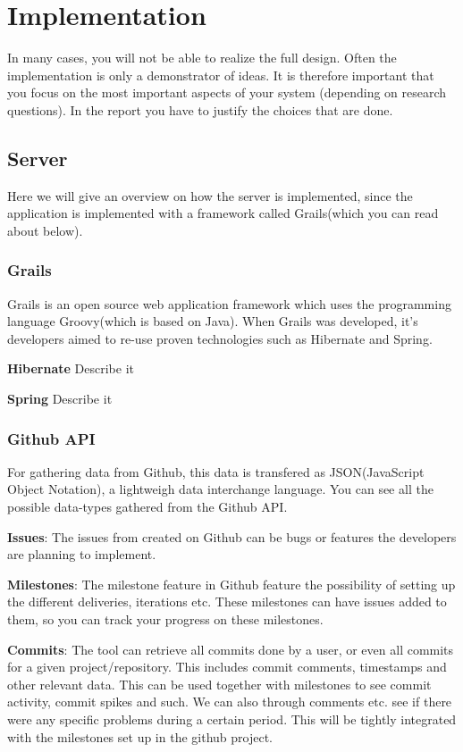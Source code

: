\chapter{Implementation}
In many cases, you will not be able to realize the full design. Often the implementation is only a demonstrator of ideas. 
It is therefore important that you focus on the most important aspects of your system (depending on research questions). 
In the report you have to justify the choices that are done.

\section{Server}
Here we will give an overview on how the server is implemented, since the application is implemented with a framework called Grails(which you can read about below).

\subsection{Grails}
Grails is an open source web application framework which uses the programming language Groovy(which is based on Java). When Grails was developed, it's developers aimed to re-use proven technologies such as Hibernate and Spring.

\textbf{Hibernate}
Describe it

\textbf{Spring}
Describe it

\subsection{Github API}
For gathering data from Github, this data is transfered as JSON(JavaScript Object Notation), a lightweigh data interchange language. You can see all the possible data-types gathered from the Github API.

\textbf{Issues}:
The issues from created on Github can be bugs or features the developers are planning to implement.

\textbf{Milestones}:
The milestone feature in Github feature the possibility of setting up the different deliveries, iterations etc. These milestones can have issues added to them, so you can track your progress on these milestones.

\textbf{Commits}:
The tool can retrieve all commits done by a user, or even all commits for a given project/repository. This includes commit comments, timestamps and other relevant data. This can be used together with milestones to see commit activity, commit spikes and such. We can also through comments etc. see if there were any specific problems during a certain period. This will be tightly integrated with the milestones set up in the github project. 


